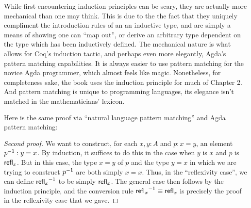 While first encountering induction principles can be scary, they are actually
more mechanical than one may think. This is due to the the fact that they
uniquely compliment the introduction rules of an an inductive type, and are
simply a means of showing one can ``map out'', or derive an arbitrary type
dependent on the type which has been inductively defined. The mechanical nature
is what allows for Coq's induction tactic, and perhaps even more elegantly,
Agda's pattern matching capabilities. It is always easier to use pattern
matching for the novice Agda programmer, which almost feels like magic.
Nonetheless, for completeness sake, the book uses the induction principle for
much of Chapter 2. And pattern matching is unique to programming languages,
its elegance isn't matched in the mathematicians' lexicon.

Here is the same proof via ``natural language pattern matching'' and Agda
pattern matching:

\begin{proof}[Second proof]
  We want to construct, for each $x,y:A$ and $p:x=y$, an element $\mathord{{p}^{-1}}:y=x$.
  By induction, it suffices to do this in the case when $y$ is $x$ and $p$ is $\mathsf{refl}_{x}$.
  But in this case, the type $x=y$ of $p$ and the type $y=x$ in which we are trying to construct $\mathord{{p}^{-1}}$ are both simply $x=x$.
  Thus, in the ``reflexivity case'', we can define $\mathord{{\mathsf{refl}_{x}}^{-1}}$ to be simply $\mathsf{refl}_{x}$.
  The general case then follows by the induction principle, and the conversion rule $\mathord{{\mathsf{refl}_{x}}^{-1}}\equiv\mathsf{refl}_{x}$ is precisely the proof in the reflexivity case that we gave.
\end{proof}

\begin{code}%
\>[0]\<%
\\
\>[0][@{}l@{\AgdaIndent{1}}]%
\>[2]\AgdaSpace{}%
\AgdaSymbol{:}\AgdaSpace{}%
\AgdaSymbol{\{}\AgdaSpace{}%
\AgdaSymbol{:}\AgdaSpace{}%
\AgdaSymbol{\}}\AgdaSpace{}%
\AgdaSymbol{\{}\AgdaSpace{}%
\AgdaSpace{}%
\AgdaSymbol{:}\AgdaSpace{}%
\AgdaSymbol{\}}\AgdaSpace{}%
\AgdaSpace{}%
\AgdaSpace{}%
\AgdaSpace{}%
\AgdaSpace{}%
\AgdaSpace{}%
\AgdaSpace{}%
\AgdaSpace{}%
\<%
\\
%
\>[2]\AgdaSpace{}%
\AgdaSymbol{\{}\AgdaSymbol{\}}\AgdaSpace{}%
\AgdaSymbol{\{}\AgdaSymbol{\}}\AgdaSpace{}%
\AgdaSymbol{\{}\AgdaSymbol{\}}\AgdaSpace{}%
\AgdaSpace{}%
\AgdaSymbol{=}\AgdaSpace{}%
\<%
\\
\>[0]\<%
\end{code}

